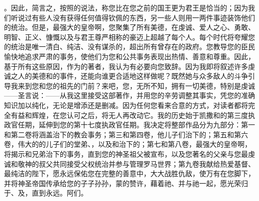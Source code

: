 。因此，简言之，按照的说法，称您比在您之前的国王更为君王是恰当的；因为我们听说过有些人没有获得任何值得钦佩的东西，另一些人则用一两件事迹装饰他们的统治。但是，最强大的皇帝啊，您聚集了所有美德，在虔诚、爱人之心、勇敢、明智、正义、慷慨以及与君王尊严相称的豪迈上超越了每个人。每个时代将夸耀您的统治是唯一清白、纯洁、没有谋杀的，超出所有曾存在的政府。您教导您的臣民愉快地追求严肃的事务，使他们为您和公共事务表现出热情、善意和尊重。因此，基于所有这些原因，作为的著者，我认为有必要向您致辞。因为我即将叙述许多虔诚之人的美德和的事件，还能向谁更合适地这样做呢？既然她与众多敌人的斗争引导我来到您和您的祖先的门前？来吧，您，无所不知，拥有一切美德，特别是虔诚——圣言说：——从我这里接受这部著作，并用您的辛劳调整其事实，凭您的准确知识加以纯化，无论是增添还是删减。因为任何您看来合意的方式，对读者都将完全有益和辉煌，在您认可之后，将无人再改动它。我的历史始于凯撒和的第三度执政官任期，延伸到您的第十七度执政官任期。我决定将整部作品分为九部分：第一和第二卷将涵盖治下的教会事务；第三和第四卷，他儿子们治下的；第五和第六卷，伟大的的儿子们的堂弟、，以及和治下的；第七和第八卷，最强大的皇帝啊，将揭示和兄弟治下的事务，直到您的神圣祖父被宣布，以及您著名的父亲与您最虔诚和敬神的叔父共同接受父权统治并参与管理罗马世界；第九卷我献给热爱基督、最纯洁的陛下，愿永远保佑您在完整的善意中，大大战胜仇敌，使万有在您脚下，并将神圣帝国传承给您的子子孙孙，蒙的赞许，藉着祂、并与祂一起，愿光荣归于、及，直到永远。阿们。\par



\section{}


